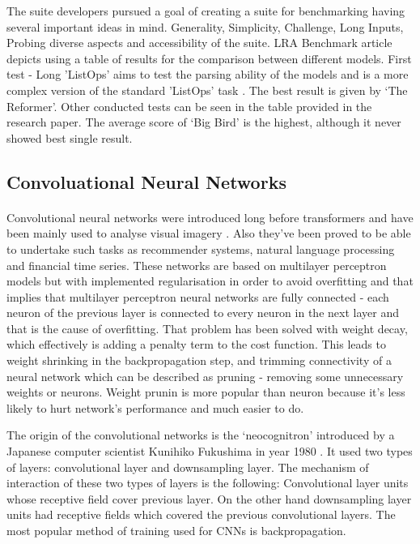 \documentclass[12pt]{report}
\begin{document}
    The suite developers pursued a goal of creating a suite for benchmarking having several important ideas in mind. Generality, Simplicity, Challenge, Long Inputs, Probing diverse aspects and accessibility of the suite.
    LRA Benchmark article depicts using a table of results for the comparison between different models. First test - Long 'ListOps' aims to test the parsing ability of the models and is a more complex version of the standard 'ListOps' task \citep{ListOps}.
    The best result is given by `The Reformer'. Other conducted tests can be seen in the table provided in the research paper. The average score of `Big Bird' is the highest, although it never showed best single result.

    \subsection*{Convoluational Neural Networks}
    \paragraph{}

    Convolutional neural networks were introduced long before transformers and have been mainly used to analyse visual imagery \citep{VALUEVA2020232}. Also they've been proved to be able to undertake such tasks as recommender systems, natural language processing and financial time series.
    These networks are based on multilayer perceptron models but with implemented regularisation in order to avoid overfitting and that implies that multilayer perceptron neural networks are fully connected - each neuron of the previous layer is connected to every neuron in the next layer and that is the cause of overfitting.
    That problem has been solved with weight decay, which effectively is adding a penalty term to the cost function. This leads to weight shrinking in the backpropagation step, and trimming connectivity of a neural network which can be described as pruning - removing some unnecessary weights or neurons. Weight prunin is more popular than neuron because it's less likely
    to hurt network's performance and much easier to do. 

    The origin of the convolutional networks is the `neocognitron' introduced by a Japanese computer scientist Kunihiko Fukushima in year 1980 \citep{neocognitron}. It used two types of layers: convolutional layer and downsampling layer. The mechanism of interaction of these two types of layers is the following:
    Convolutional layer units whose receptive field cover previous layer. On the other hand downsampling layer units had receptive fields which covered the previous convolutional layers. The most popular method of training used for CNNs is backpropagation.
\end{document}
